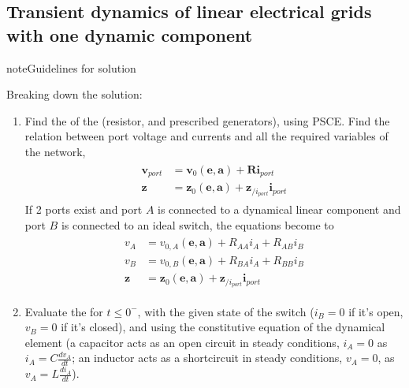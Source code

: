 \documentclass[letterpaper,10pt,english]{jupyterBook}
\begin{document}
\subsection{Transient dynamics of linear electrical grids with one dynamic component}
\label{\detokenize{ch/electrical-engineering-exercises-transient-1-dynamic:transient-dynamics-of-linear-electrical-grids-with-one-dynamic-component}}\label{\detokenize{ch/electrical-engineering-exercises-transient-1-dynamic:classical-electromagnetism-electrical-engineering-exercises-transient-1-dynamic}}\label{\detokenize{ch/electrical-engineering-exercises-transient-1-dynamic::doc}}
\begin{sphinxadmonition}{note}{Guidelines for solution}

\sphinxAtStartPar
Breaking down the solution:
\begin{enumerate}
%
\item {} 
\sphinxAtStartPar
Find the  of the  (resistor, and prescribed generators), using PSCE. Find the relation between port voltage and currents and all the required variables of the network,
\begin{equation*}
\begin{split}\begin{aligned}
     \mathbf{v}_{port} & = \mathbf{v}_0(\mathbf{e}, \mathbf{a}) + \mathbf{R} \mathbf{i}_{port} \\
     \mathbf{z}        & = \mathbf{z}_0(\mathbf{e}, \mathbf{a}) + \mathbf{z}_{/i_{port}} \mathbf{i}_{port}
   \end{aligned}\end{split}
\end{equation*}
\sphinxAtStartPar
If 2 ports exist and port \(A\) is connected to a dynamical linear component and port \(B\) is connected to an ideal switch, the equations become to
\begin{equation*}
\begin{split}\begin{aligned}
     v_A & = v_{0,A}(\mathbf{e},\mathbf{a}) + R_{AA} i_A + R_{AB} i_B \\
     v_B & = v_{0,B}(\mathbf{e},\mathbf{a}) + R_{BA} i_A + R_{BB} i_B \\
     \mathbf{z} & = \mathbf{z}_0(\mathbf{e}, \mathbf{a}) + \mathbf{z}_{/i_{port}} \mathbf{i}_{port}
   \end{aligned}\end{split}
\end{equation*}
\item {} 
\sphinxAtStartPar
Evaluate the  for \(t \le 0^-\), with the given state of the switch (\(i_B = 0\) if it’s open, \(v_B = 0\) if it’s closed), and using the constitutive equation of the dynamical element (a capacitor acts as an open circuit in steady conditions, \(i_A = 0\) as \(i_A = C \frac{d v_A}{dt}\); an inductor acts as a short\sphinxhyphen{}circuit in steady conditions, \(v_A = 0\), as \(v_A = L \frac{d i_A}{d t}\)).


\end{enumerate}
\end{sphinxadmonition}
\end{document}
